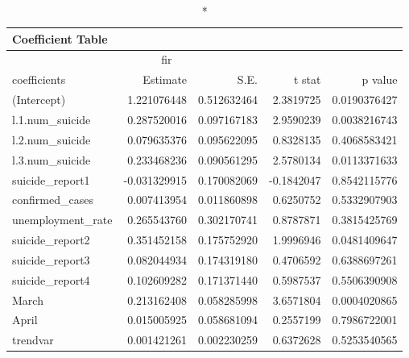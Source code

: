 \begin{longtable}{lrrrr}
\caption*{
{\large Coefficient Table}
} \\ 
\toprule
\multicolumn{4}{c}{fir} &  \\ 
\cmidrule(lr){1-4}
coefficients & Estimate & S.E. & t stat & p value \\ 
\midrule
(Intercept) & 1.221076448 & 0.512632464 & 2.3819725 & 0.0190376427 \\ 
l.1.num\_suicide & 0.287520016 & 0.097167183 & 2.9590239 & 0.0038216743 \\ 
l.2.num\_suicide & 0.079635376 & 0.095622095 & 0.8328135 & 0.4068583421 \\ 
l.3.num\_suicide & 0.233468236 & 0.090561295 & 2.5780134 & 0.0113371633 \\ 
suicide\_report1 & -0.031329915 & 0.170082069 & -0.1842047 & 0.8542115776 \\ 
confirmed\_cases & 0.007413954 & 0.011860898 & 0.6250752 & 0.5332907903 \\ 
unemployment\_rate & 0.265543760 & 0.302170741 & 0.8787871 & 0.3815425769 \\ 
suicide\_report2 & 0.351452158 & 0.175752920 & 1.9996946 & 0.0481409647 \\ 
suicide\_report3 & 0.082044934 & 0.174319180 & 0.4706592 & 0.6388697261 \\ 
suicide\_report4 & 0.102609282 & 0.171371440 & 0.5987537 & 0.5506390908 \\ 
March & 0.213162408 & 0.058285998 & 3.6571804 & 0.0004020865 \\ 
April & 0.015005925 & 0.058681094 & 0.2557199 & 0.7986722001 \\ 
trendvar & 0.001421261 & 0.002230259 & 0.6372628 & 0.5253540565 \\ 
\bottomrule
\end{longtable}

